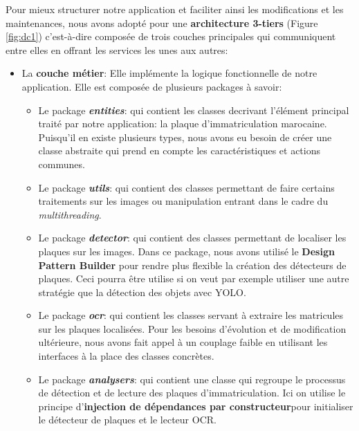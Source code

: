     
    Pour mieux structurer notre application et faciliter ainsi les modifications et les maintenances, nous avons adopté pour une \textbf{architecture 3-tiers} (Figure \ref{fig:dc1}) c’est-à-dire composée de trois couches principales qui communiquent entre elles en offrant les services les unes aux autres:
    \begin{itemize}
        \item La \textbf{couche métier}: Elle implémente la logique fonctionnelle de notre application. Elle est composée de plusieurs packages à savoir:
            \begin{itemize}
                \item Le package \textbf{\textit{entities}}: qui contient les classes decrivant l'élément principal traité par notre application: la plaque d'immatriculation marocaine. Puisqu'il en existe plusieurs types, nous avons eu besoin de créer une classe abstraite qui prend en compte les caractéristiques et actions communes.
                
                \item Le package \textbf{\textit{utils}}: qui contient des classes permettant de faire certains traitements sur les images ou manipulation entrant dans le cadre du \textit{multithreading}.
                
                \item Le package \textbf{\textit{detector}}: qui contient des classes permettant de localiser les plaques sur les images. Dans ce package, nous avons utilisé le \textbf{Design Pattern Builder} pour rendre plus flexible la création des détecteurs de plaques. Ceci pourra être utilise si on veut par exemple utiliser une autre stratégie que la détection des objets avec YOLO.
                
                \item Le package \textbf{\textit{ocr}}: qui contient les classes servant à extraire les matricules sur les plaques localisées. Pour les besoins d'évolution et de modification ultérieure, nous avons fait appel à un couplage faible en utilisant les interfaces à la place des classes concrètes.
                
                \item Le package \textbf{\textit{analysers}}: qui contient une classe qui regroupe le processus de détection et de lecture des plaques d'immatriculation. Ici on utilise le principe d'\textbf{injection de dépendances par constructeur}pour initialiser le détecteur de plaques et le lecteur OCR.
                

\end{itemize}
\end{itemize}
